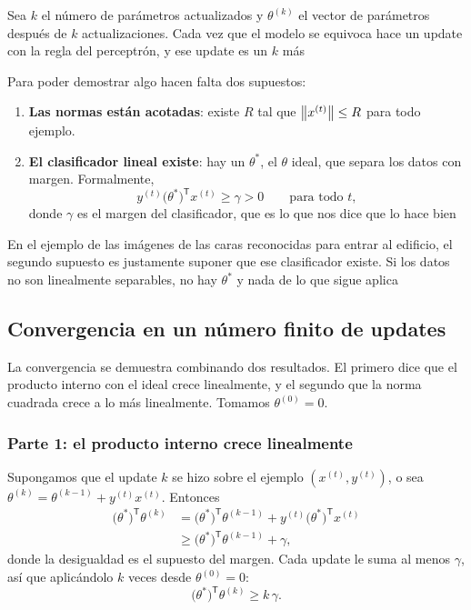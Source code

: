 \documentclass[11pt,letterpaper]{article}
\begin{document}
Sea $k$ el número de parámetros actualizados y $\theta^{(k)}$ el
vector de parámetros después de $k$ actualizaciones. Cada vez que el
modelo se equivoca hace un update con la regla del perceptrón, y ese
update es un $k$ más

Para poder demostrar algo hacen falta dos supuestos:

\begin{enumerate}[itemsep=0.2em]
    \item \textbf{Las normas están acotadas}: existe $R$ tal que
          $\left\lVert x^{(t)} \right\rVert \leq R$ para todo ejemplo.
    \item \textbf{El clasificador lineal existe}: hay un
          $\theta^{*}$, el $\theta$ ideal, que separa los datos con
          margen. Formalmente,
          \[
              y^{(t)} \big(\theta^{*}\big)^{\mathsf{T}} x^{(t)}
              \geq \gamma > 0
              \qquad \text{para todo } t ,
          \]
          donde $\gamma$ es el margen del clasificador, que es lo que
          nos dice que lo hace bien
\end{enumerate}

\begin{ojo}
  En el ejemplo de las imágenes de las caras reconocidas para entrar
  al edificio, el segundo supuesto es justamente suponer que ese
  clasificador existe. Si los datos no son linealmente separables, no
  hay $\theta^{*}$ y nada de lo que sigue aplica
\end{ojo}


\subsection*{Convergencia en un número finito de updates}

La convergencia se demuestra combinando dos resultados. El primero
dice que el producto interno con el ideal crece linealmente, y el
segundo que la norma cuadrada crece a lo más linealmente. Tomamos
$\theta^{(0)} = 0$.

\subsubsection*{Parte 1: el producto interno crece linealmente}

Supongamos que el update $k$ se hizo sobre el ejemplo
$(x^{(t)}, y^{(t)})$, o sea
$\theta^{(k)} = \theta^{(k-1)} + y^{(t)} x^{(t)}$. Entonces
\begin{align*}
    \big(\theta^{*}\big)^{\mathsf{T}} \theta^{(k)}
      &= \big(\theta^{*}\big)^{\mathsf{T}} \theta^{(k-1)}
         + y^{(t)} \big(\theta^{*}\big)^{\mathsf{T}} x^{(t)} \\
      &\geq \big(\theta^{*}\big)^{\mathsf{T}} \theta^{(k-1)}
            + \gamma ,
\end{align*}
donde la desigualdad es el supuesto del margen. Cada update le suma
al menos $\gamma$, así que aplicándolo $k$ veces desde
$\theta^{(0)} = 0$:
\[
    \big(\theta^{*}\big)^{\mathsf{T}} \theta^{(k)} \geq k\,\gamma .
\]
\end{document}
